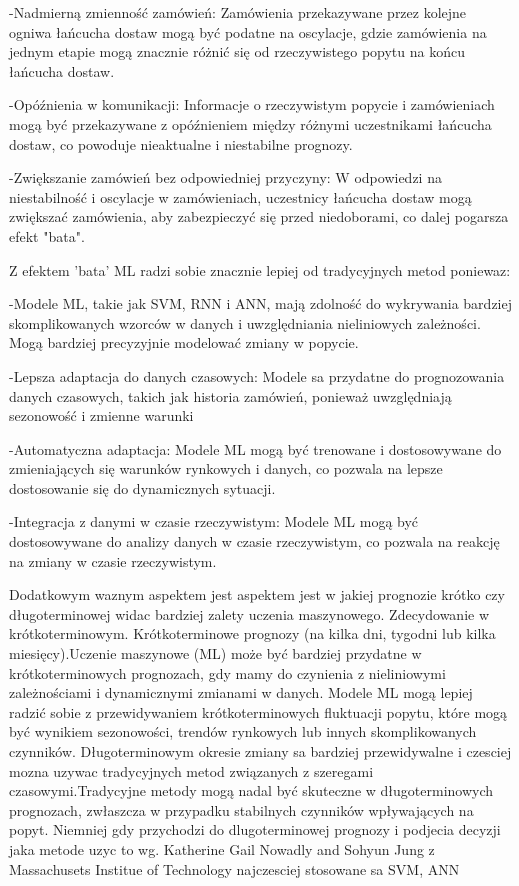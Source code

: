 -Nadmierną zmienność zamówień: Zamówienia przekazywane przez kolejne ogniwa łańcucha dostaw mogą być podatne na oscylacje, gdzie zamówienia na jednym etapie mogą znacznie różnić się od rzeczywistego popytu na końcu łańcucha dostaw.

-Opóźnienia w komunikacji: Informacje o rzeczywistym popycie i zamówieniach mogą być przekazywane z opóźnieniem między różnymi uczestnikami łańcucha dostaw, co powoduje nieaktualne i niestabilne prognozy.

-Zwiększanie zamówień bez odpowiedniej przyczyny: W odpowiedzi na niestabilność i oscylacje w zamówieniach, uczestnicy łańcucha dostaw mogą zwiększać zamówienia, aby zabezpieczyć się przed niedoborami, co dalej pogarsza efekt "bata".

Z efektem 'bata' ML radzi sobie znacznie lepiej od tradycyjnych metod poniewaz:

-Modele ML, takie jak SVM, RNN i ANN, mają zdolność do wykrywania bardziej skomplikowanych wzorców w danych i uwzględniania nieliniowych zależności. Mogą bardziej precyzyjnie modelować zmiany w popycie.

-Lepsza adaptacja do danych czasowych: Modele sa przydatne do prognozowania danych czasowych, takich jak historia zamówień, ponieważ uwzględniają sezonowość i zmienne warunki

-Automatyczna adaptacja: Modele ML mogą być trenowane i dostosowywane do zmieniających się warunków rynkowych i danych, co pozwala na lepsze dostosowanie się do dynamicznych sytuacji.

-Integracja z danymi w czasie rzeczywistym: Modele ML mogą być dostosowywane do analizy danych w czasie rzeczywistym, co pozwala na reakcję na zmiany w czasie rzeczywistym.


Dodatkowym waznym aspektem jest aspektem jest w jakiej prognozie krótko czy długoterminowej widac bardziej zalety uczenia maszynowego. Zdecydowanie w krótkoterminowym. Krótkoterminowe prognozy (na kilka dni, tygodni lub kilka miesięcy).Uczenie maszynowe (ML) może być bardziej przydatne w krótkoterminowych prognozach, gdy mamy do czynienia z nieliniowymi zależnościami i dynamicznymi zmianami w danych. Modele ML mogą lepiej radzić sobie z przewidywaniem krótkoterminowych fluktuacji popytu, które mogą być wynikiem sezonowości, trendów rynkowych lub innych skomplikowanych czynników. Długoterminowym okresie zmiany sa bardziej przewidywalne i czesciej mozna uzywac tradycyjnych metod związanych z szeregami czasowymi.Tradycyjne metody mogą nadal być skuteczne w długoterminowych prognozach, zwłaszcza w przypadku stabilnych czynników wpływających na popyt. 
Niemniej gdy przychodzi do dlugoterminowej prognozy i podjecia decyzji jaka metode uzyc to wg. Katherine Gail Nowadly  and Sohyun Jung z Massachusets Institue of Technology najczesciej stosowane sa SVM, ANN\cite{Gail2020}


